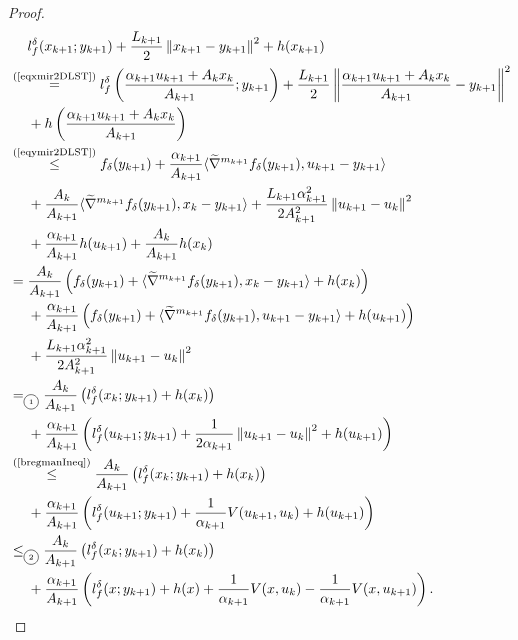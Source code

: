 \documentclass[11pt,a4]{article}
\newcommand{\norm}[1]{\left\lVert#1\right\rVert}
\newcommand{\leqarg}[1]{\ensuremath{\stackrel{\text{#1}}{\leq}}}
\newcommand{\eqarg}[1]{\ensuremath{\stackrel{\text{#1}}{=}}}
\newcommand*\circled[1]{\tikz[baseline=(char.base)]{
		\node[shape=circle,draw,inner sep=2pt] (char) {#1};}}
\begin{document}
\begin{proof}
	\begin{align*}
	&\hphantom{{}={}}l_f^\delta(x_{k+1};y_{k+1})  + \frac{L_{k+1}}{2}\norm{x_{k+1} - y_{k+1}}^2 + h(x_{k+1}) \\
	&\eqarg{(\ref{eqxmir2DLST})}l_f^\delta\left(\frac{\alpha_{k+1}u_{k+1} + A_k x_k}{A_{k+1}};y_{k+1}\right)  + \frac{L_{k+1}}{2}\norm{\frac{\alpha_{k+1}u_{k+1} + A_k x_k}{A_{k+1}} - y_{k+1}}^2\\
	&\hphantom{{}={}}+ h\left(\frac{\alpha_{k+1}u_{k+1} + A_k x_k}{A_{k+1}}\right)\\
	&\leqarg{(\ref{eqymir2DLST})} f_\delta(y_{k+1}) + \frac{\alpha_{k+1}}{A_{k+1}}\langle \widetilde{\nabla}^{m_{k+1}} f_\delta(y_{k+1}), u_{k+1} - y_{k+1} \rangle\ \\
	&\hphantom{{}={}}+\frac{A_k}{A_{k+1}}\langle \widetilde{\nabla}^{m_{k+1}} f_\delta(y_{k+1}), x_k - y_{k+1} \rangle  + \frac{L_{k+1} \alpha^2_{k+1}}{2 A^2_{k+1}}\norm{u_{k+1} - u_k}^2 \\
	 &\hphantom{{}={}}+ \frac{\alpha_{k+1}}{A_{k+1}}h(u_{k+1}) + \frac{A_k}{A_{k+1}}h(x_k)\\&=
	 \frac{A_k}{A_{k+1}}\left(f_\delta(y_{k+1}) + \langle \widetilde{\nabla}^{m_{k+1}} f_\delta(y_{k+1}), x_k - y_{k+1} \rangle + h(x_k)\right)
	 \\&\hphantom{{}={}}+
	 \frac{\alpha_{k+1}}{A_{k+1}}\left(f_\delta(y_{k+1}) + 
	 \langle \widetilde{\nabla}^{m_{k+1}} f_\delta(y_{k+1}), u_{k+1} - y_{k+1} \rangle + h(u_{k+1})\right)\\
	 &\hphantom{{}={}}+\frac{L_{k+1} \alpha^2_{k+1}}{2 A^2_{k+1}}\norm{u_{k+1} - u_k}^2\\ &=_{{\tiny \circled{1}}}
	 \frac{A_k}{A_{k+1}}\left(l_f^\delta(x_k;y_{k+1}) + h(x_k)\right)\\
	 &\hphantom{{}={}}+\frac{\alpha_{k+1}}{A_{k+1}}\left(l_f^\delta(u_{k+1};y_{k+1})
	 + \frac{1}{2 \alpha_{k+1}}\norm{u_{k+1} - u_k}^2 + h(u_{k+1})\right) \\&\leqarg{(\ref{bregmanIneq})}
	 \frac{A_k}{A_{k+1}}\left(l_f^\delta(x_k;y_{k+1}) + h(x_k)\right)\\
	 &\hphantom{{}={}}+\frac{\alpha_{k+1}}{A_{k+1}}\left(l_f^\delta(u_{k+1};y_{k+1})
	 + \frac{1}{\alpha_{k+1}}V(u_{k+1}, u_k) + h(u_{k+1})\right) \\&\leq_{{\tiny \circled{2}}}
	 \frac{A_k}{A_{k+1}}\left(l_f^\delta(x_k;y_{k+1}) + h(x_k)\right) \\
	 &\hphantom{{}={}}+
	 \frac{\alpha_{k+1}}{A_{k+1}}\left(l_f^\delta(x;y_{k+1}) + h(x)
	 + \frac{1}{\alpha_{k+1}}V(x, u_k) - \frac{1}{\alpha_{k+1}}V(x, u_{k+1})\right).
	\end{align*}
\end{proof}
\end{document}
